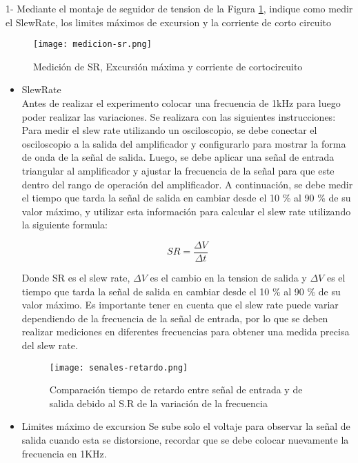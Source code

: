 1- Mediante el montaje de seguidor de tension de la Figura \ref{fig:medicion-sr}, indique como medir el SlewRate, los limites máximos de excursion y la corriente de corto circuito

\begin{figure}[ht]
    \centering
    \texttt{[image: medicion-sr.png]}
    \caption{Medición de SR, Excursión máxima y corriente de cortocircuito}
    \label{fig:medicion-sr}
\end{figure}

\begin{itemize}
    \item SlewRate \\
    Antes de realizar el experimento colocar una frecuencia de 1kHz para luego poder realizar las variaciones. Se realizara con las siguientes instrucciones: Para medir el slew rate utilizando un osciloscopio, se debe conectar el osciloscopio a la salida del amplificador y configurarlo para mostrar la forma de onda de la señal de salida. Luego, se debe aplicar una señal de entrada triangular al amplificador y ajustar la frecuencia de la señal para que este dentro del rango de operación del amplificador. A continuación, se debe medir el tiempo que tarda la señal de salida en cambiar desde el 10 \% al 90 \% de su valor máximo, y utilizar esta información para calcular el slew rate utilizando la siguiente formula:

    $$SR = \frac{\Delta V}{\Delta t}$$

    Donde SR es el slew rate, $\Delta V$ es el cambio en la tension de salida y $\Delta V$ es el tiempo que tarda la señal de salida en cambiar desde el 10 \% al 90 \% de su valor máximo. Es importante tener en cuenta que el slew rate puede variar dependiendo de la frecuencia de la señal de entrada, por lo que se deben realizar mediciones en diferentes frecuencias para obtener una medida precisa del slew rate.

    \begin{figure}[ht]
        \centering
        \texttt{[image: senales-retardo.png]}
        \caption{Comparación tiempo de retardo entre señal de entrada y de salida debido al S.R de la variación de la frecuencia}
        \label{fig:comparacion-funciones-sr}
    \end{figure}

    \item Limites máximo de excursion
    Se sube solo el voltaje para observar la señal de salida cuando esta se distorsione, recordar que se debe colocar nuevamente la frecuencia en 1KHz.


\end{itemize}
